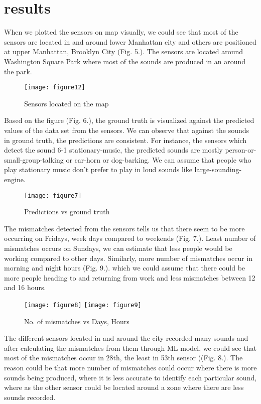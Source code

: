 	\section{results}
	When we plotted the sensors on map visually, we could see that most of the sensors are located in and around lower Manhattan city and others are positioned at upper Manhattan, Brooklyn City (Fig. 5.). The sensors are located around Washington Square Park where most of the sounds are produced in an around the park. 

	\begin{figure}[h!]
		\centering
		\texttt{[image: figure12]}
		\caption{Sensors located on the map}
	\end{figure}

	Based on the figure (Fig. 6.), the ground truth is visualized against the predicted values of the data set from the sensors. We can observe that against the sounds in ground truth, the predictions are consistent. For instance, the sensors which detect the sound 6-1 stationary-music, the predicted sounds are mostly person-or-small-group-talking or car-horn or dog-barking. We can assume that people who play stationary music don't prefer to play in loud sounds like large-sounding-engine.  

	\begin{figure}[h!]
		\texttt{[image: figure7]}
		\caption{Predictions vs ground truth}
	\end{figure}

	The mismatches detected from the sensors tells us that there seem to be more occurring on Fridays, week days compared to weekends (Fig. 7.). Least number of mismatches occurs on Sundays, we can estimate that less people would be working compared to other days.
	Similarly, more number of mismatches occur in morning and night hours (Fig. 9.). which we could assume that there could be more people heading to and returning from work and less mismatches between 12 and 16 hours.


	\begin{figure}[h!]
		\centering
		\texttt{[image: figure8]}
		\texttt{[image: figure9]}
		\caption{No. of mismatches vs Days, Hours}
	\end{figure}

	The different sensors located in and around the city recorded many sounds and after calculating the mismatches from them through ML model, we could see that most of the mismatches occur in 28th, the least in 53th sensor ((Fig. 8.). The reason could be that more number of mismatches could occur where there is more sounds being produced, where it is less accurate to identify each particular sound, where as the other sensor could be located around a zone where there are less sounds recorded.

